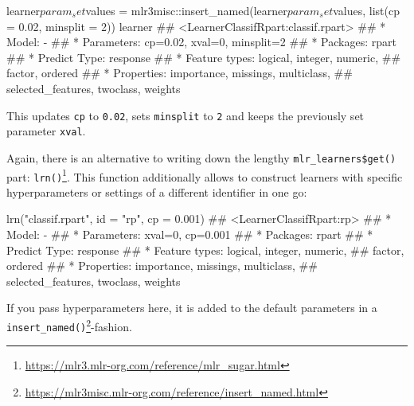 \documentclass[12pt,]{scrbook}
\newenvironment{Shaded}{}{}
\newcommand{\DataTypeTok}[1]{#1}
\newcommand{\DecValTok}[1]{#1}
\newcommand{\FloatTok}[1]{#1}
\newcommand{\KeywordTok}[1]{\textcolor[rgb]{0.00,0.00,1.00}{#1}}
\newcommand{\NormalTok}[1]{#1}
\newcommand{\OperatorTok}[1]{#1}
\newcommand{\StringTok}[1]{\textcolor[rgb]{0.00,0.50,0.50}{#1}}
\renewcommand{\href}[2]{#2\footnote{\url{#1}}}
\begin{document}
\begin{Shaded}
\begin{Highlighting}[]
\NormalTok{learner}\OperatorTok{$}\NormalTok{param_set}\OperatorTok{$}\NormalTok{values =}\StringTok{ }\NormalTok{mlr3misc}\OperatorTok{::}\KeywordTok{insert_named}\NormalTok{(learner}\OperatorTok{$}\NormalTok{param_set}\OperatorTok{$}\NormalTok{values, }
  \KeywordTok{list}\NormalTok{(}\DataTypeTok{cp =} \FloatTok{0.02}\NormalTok{, }\DataTypeTok{minsplit =} \DecValTok{2}\NormalTok{))}
\NormalTok{learner}
\NormalTok{## <LearnerClassifRpart:classif.rpart>}
\NormalTok{## * Model: -}
\NormalTok{## * Parameters: cp=0.02, xval=0, minsplit=2}
\NormalTok{## * Packages: rpart}
\NormalTok{## * Predict Type: response}
\NormalTok{## * Feature types: logical, integer, numeric,}
\NormalTok{##   factor, ordered}
\NormalTok{## * Properties: importance, missings, multiclass,}
\NormalTok{##   selected_features, twoclass, weights}
\end{Highlighting}
\end{Shaded}

This updates \texttt{cp} to \texttt{0.02}, sets \texttt{minsplit} to \texttt{2} and keeps the previously set parameter \texttt{xval}.

Again, there is an alternative to writing down the lengthy \texttt{mlr\_learners\$get()} part: \href{https://mlr3.mlr-org.com/reference/mlr_sugar.html}{\texttt{lrn()}}.
This function additionally allows to construct learners with specific hyperparameters or settings of a different identifier in one go:

\begin{Shaded}
\begin{Highlighting}[]
\KeywordTok{lrn}\NormalTok{(}\StringTok{"classif.rpart"}\NormalTok{, }\DataTypeTok{id =} \StringTok{"rp"}\NormalTok{, }\DataTypeTok{cp =} \FloatTok{0.001}\NormalTok{)}
\NormalTok{## <LearnerClassifRpart:rp>}
\NormalTok{## * Model: -}
\NormalTok{## * Parameters: xval=0, cp=0.001}
\NormalTok{## * Packages: rpart}
\NormalTok{## * Predict Type: response}
\NormalTok{## * Feature types: logical, integer, numeric,}
\NormalTok{##   factor, ordered}
\NormalTok{## * Properties: importance, missings, multiclass,}
\NormalTok{##   selected_features, twoclass, weights}
\end{Highlighting}
\end{Shaded}

If you pass hyperparameters here, it is added to the default parameters in a \href{https://mlr3misc.mlr-org.com/reference/insert_named.html}{\texttt{insert\_named()}}-fashion.
\end{document}
